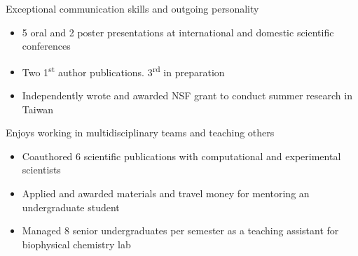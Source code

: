 

\begin{cventries}
\vspace{-4.0mm}

  \cventry
    {} %
    {} %
    {} %
    {} %
    {
      \begin{cvitems} %
        \item {Exceptional communication skills and outgoing personality}
        \begin{itemize}
       	 	\item 5 oral and 2 poster presentations at international and domestic scientific conferences
       	 	\item Two 1\textsuperscript{st} author publications. 3\textsuperscript{rd} in preparation
       	 	\item Independently wrote and awarded NSF grant to conduct summer research in Taiwan
        \end{itemize}
        \vspace{1.0mm}
        \item {Enjoys working in multidisciplinary teams and teaching others}
        \begin{itemize}
         	\item Coauthored 6 scientific publications with computational and experimental scientists
         	\item Applied and awarded materials and travel money for mentoring an undergraduate student
         	\item Managed 8 senior undergraduates per semester as a teaching assistant for biophysical chemistry lab
        \end{itemize}
      \end{cvitems}
    }
\vspace{-4.0mm}
\end{cventries}
